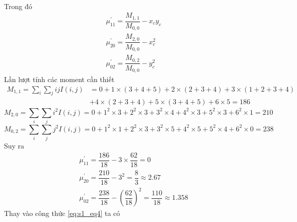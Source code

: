 \begin{itemize}
\begin{align}
                         \label{eq:s1_eq4}
                    \end{align}
                    \hspace*{0.6cm}Trong đó 
                    \begin{align*}
                         &\mu_{11}^{'} = \dfrac{M_{1,1}}{M_{0,0}} - x_c y_c\\
                         &\mu_{20}^{'} = \dfrac{M_{2,0}}{M_{0,0}} - x_c^2\\
                         &\mu_{02}^{'} = \dfrac{M_{0,2}}{M_{0,0}} - y_c^2
                    \end{align*}
                    \hspace*{0.6cm}Lần lượt tính các moment cần thiết
                    \begin{align*}
                         M_{1,1} = \sum_{i} \sum_{j} i j I(i,j) &= 0 + 1 \times (3 + 4 + 5) + 2 \times (2 + 3 + 4) + 3 \times (1 + 2 + 3 + 4)\\
                                   & + 4 \times (2 + 3 + 4) + 5 \times (3 + 4 + 5) + 6 \times 5 = 186
                    \end{align*}
                    \begin{equation*}
                         M_{2,0} = \sum_{i} \sum_{j} i^2 I(i,j) = 0 + 1^2 \times 3 + 2^2 \times 3 + 3^2 \times 4 + 4^2 \times 3 + 5^2 \times 3 + 6^2 \times 1 = 210                    
                    \end{equation*}
                    \begin{equation*}
                         M_{0,2} = \sum_{i} \sum_{j} j^2 I(i,j) = 0 + 1^2 \times 1 + 2^2 \times 3 + 3^2 \times 5 + 4^2 \times 5 + 5^2 \times 4 + 6^2 \times 0 = 238          
                    \end{equation*}
                    \hspace*{0.6cm}Suy ra
                    \begin{align*}
                         &\mu_{11}^{'} = \dfrac{186}{18} - 3 \times \dfrac{62}{18} = 0\\
                         &\mu_{20}^{'} = \dfrac{210}{18} - 3^2 = \dfrac{8}{3} \approx 2.67\\
                         &\mu_{02}^{'} = \dfrac{238}{18} - \left( \dfrac{62}{18} \right)^2 = \dfrac{110}{18} \approx 1.358
                    \end{align*}
                    \hspace*{0.6cm}Thay vào công thức \ref{eq:s1_eq4} ta có
                    \begin{equation*}

\end{equation*}
\end{itemize}
